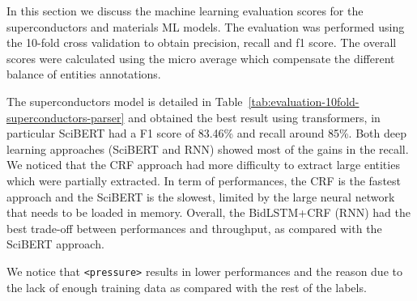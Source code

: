 \documentclass{article}
\begin{document}
In this section we discuss the machine learning evaluation scores for the superconductors and materials ML models. The evaluation was performed using the 10-fold cross validation to obtain precision, recall and f1 score. The overall scores were calculated using the micro average which compensate the different balance of entities annotations. 

The superconductors model is detailed in Table~\ref{tab:evaluation-10fold-superconductors-parser} and obtained the best result using transformers, in particular SciBERT had a F1 score of 83.46\% and recall around 85\%. Both deep learning approaches (SciBERT and RNN) showed most of the gains in the recall.
We noticed that the CRF approach had more difficulty to extract large entities which were partially extracted. 
In term of performances, the CRF is the fastest approach and the SciBERT is the slowest, limited by the large neural network that needs to be loaded in memory.
Overall, the BidLSTM+CRF (RNN) had the best trade-off between performances and throughput, as compared with the SciBERT approach. 

We notice that \texttt{<pressure>} results in lower performances and the reason due to the lack of enough training data as compared with the rest of the labels. 

\begin{table}[ht]
\centering
{}
\caption{Evaluation scores for the superconductor models using 10-fold cross-validation. }
\label{tab:evaluation-10fold-superconductors-parser}
\end{table}
\end{document}
